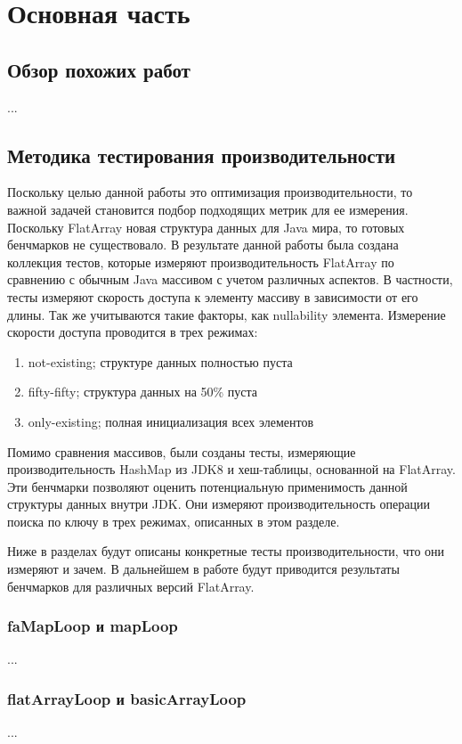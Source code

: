 \section{Основная часть}
\subsection{Обзор похожих работ}
...

\subsection{Методика тестирования производительности}
Поскольку целью данной работы это оптимизация производительности, то важной задачей становится подбор подходящих метрик для ее измерения. Поскольку FlatArray новая структура данных для Java мира, то готовых бенчмарков не существовало. 
В результате данной работы была создана коллекция тестов, которые измеряют производительность FlatArray по сравнению с обычным Java массивом с учетом различных аспектов.
В частности, тесты измеряют скорость доступа к элементу массиву в зависимости от его длины. Так же учитываются такие факторы, как nullability элемента. Измерение скорости доступа проводится в трех режимах:
\begin{enumerate}
	\item not-existing; структуре данных полностью пуста
	\item fifty-fifty; структура данных на 50\% пуста
	\item only-existing; полная инициализация всех элементов
\end{enumerate}
Помимо сравнения массивов, были созданы тесты, измеряющие производительность HashMap из JDK8 и хеш-таблицы, основанной на FlatArray. Эти бенчмарки позволяют оценить потенциальную применимость данной структуры данных внутри JDK. Они измеряют производительность операции поиска по ключу в трех режимах, описанных в этом разделе.
\par
Ниже в разделах будут описаны конкретные тесты производительности, что они измеряют и зачем. В дальнейшем в работе будут приводится результаты бенчмарков для различных версий FlatArray.
\subsubsection{faMapLoop и mapLoop}
...

\subsubsection{flatArrayLoop и basicArrayLoop}
...

